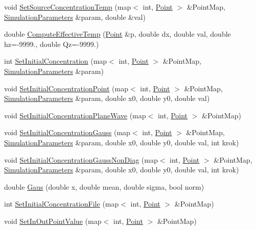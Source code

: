 \begin{DoxyCompactItemize}
\item 
void \hyperlink{class_simulation_ad8c565d908664e7b5d419261af556ae9}{Set\+Source\+Concentration\+Temp} (map$<$ int, \hyperlink{class_point}{Point} $>$ \&Point\+Map, \hyperlink{class_simulation_parameters}{Simulation\+Parameters} \&param, double \&val)
\item 
double \hyperlink{class_simulation_a9bd641b3fd013d152d03b5b5ea718d73}{Compute\+Effective\+Temp} (\hyperlink{class_point}{Point} \&p, double dx, double val, double hz=-\/9999., double Qz=-\/9999.)
\item 
int \hyperlink{class_simulation_a3253bdc42110ee6653d7f02a420b56af}{Set\+Initial\+Concentration} (map$<$ int, \hyperlink{class_point}{Point} $>$ \&Point\+Map, \hyperlink{class_simulation_parameters}{Simulation\+Parameters} \&param)
\item 
void \hyperlink{class_simulation_ae713b7bd19b86d3e426c899785b9ce8a}{Set\+Initial\+Concentration\+Point} (map$<$ int, \hyperlink{class_point}{Point} $>$ \&Point\+Map, \hyperlink{class_simulation_parameters}{Simulation\+Parameters} \&param, double x0, double y0, double val)
\item 
void \hyperlink{class_simulation_a41155db84b2177e858dfd8274a9a4a93}{Set\+Initial\+Concentration\+Plane\+Wave} (map$<$ int, \hyperlink{class_point}{Point} $>$ \&Point\+Map)
\item 
void \hyperlink{class_simulation_aed95dfa701b563cbd85421bfeb4f74fd}{Set\+Initial\+Concentration\+Gauss} (map$<$ int, \hyperlink{class_point}{Point} $>$ \&Point\+Map, \hyperlink{class_simulation_parameters}{Simulation\+Parameters} \&param, double x0, double y0, double val, int krok)
\item 
void \hyperlink{class_simulation_a4f95080d3efd1568155f493150ea6a5e}{Set\+Initial\+Concentration\+Gauss\+Non\+Diag} (map$<$ int, \hyperlink{class_point}{Point} $>$ \&Point\+Map, \hyperlink{class_simulation_parameters}{Simulation\+Parameters} \&param, double x0, double y0, double val, int krok)
\item 
double \hyperlink{class_simulation_a99e94c6106312a2e741e4a7fbfc17acc}{Gaus} (double x, double mean, double sigma, bool norm)
\item 
int \hyperlink{class_simulation_a63da2c122d167f06255071009070f0b2}{Set\+Initial\+Concentration\+File} (map$<$ int, \hyperlink{class_point}{Point} $>$ \&Point\+Map)
\item 
void \hyperlink{class_simulation_a404b11e725f52fc7e87986956229fa38}{Set\+In\+Out\+Point\+Value} (map$<$ int, \hyperlink{class_point}{Point} $>$ \&Point\+Map)

\end{DoxyCompactItemize}
